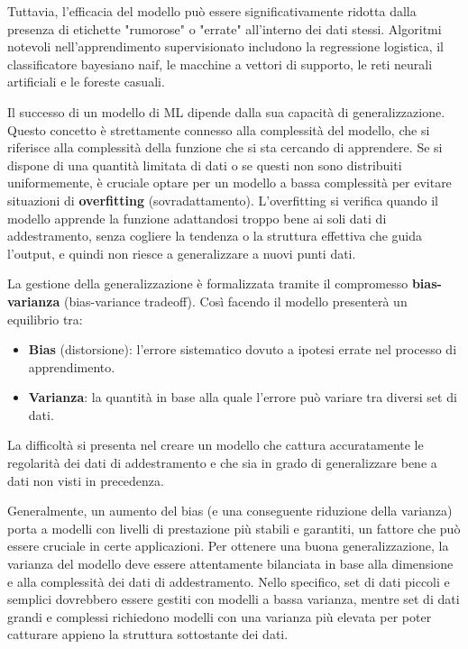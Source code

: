 Tuttavia, l'efficacia del modello può essere significativamente ridotta dalla
presenza di etichette "rumorose" o "errate" all'interno dei dati stessi.
Algoritmi notevoli nell'apprendimento supervisionato includono la regressione
logistica, il classificatore bayesiano naif, le macchine a vettori di supporto,
le reti neurali artificiali e le foreste casuali.

Il successo di un modello di ML dipende dalla sua capacità di
generalizzazione. Questo concetto è strettamente connesso alla complessità del
modello, che si riferisce alla complessità della funzione che si sta cercando
di apprendere.
Se si dispone di una quantità limitata di dati o se questi non sono distribuiti
uniformemente, è cruciale optare per un modello a bassa complessità per evitare
situazioni di \textbf{overfitting} (sovradattamento).
L'overfitting si verifica quando il modello apprende la funzione adattandosi
troppo bene ai soli dati di addestramento, senza cogliere la tendenza o la
struttura effettiva che guida l'output, e quindi non riesce a generalizzare
a nuovi punti dati.

La gestione della generalizzazione è formalizzata tramite il compromesso
\textbf{bias-varianza} (bias-variance tradeoff).
Così facendo il modello presenterà un equilibrio tra:
\begin{itemize}
    \item \textbf{Bias} (distorsione): l'errore sistematico dovuto a ipotesi errate nel
    processo di apprendimento.
    \item \textbf{Varianza}: la quantità in base alla quale l'errore può
    variare tra diversi set di dati.
\end{itemize}

La difficoltà si presenta nel creare un modello che cattura accuratamente le
regolarità dei dati di addestramento e che sia in grado di generalizzare bene
a dati non visti in precedenza.

Generalmente, un aumento del bias (e una conseguente riduzione della
varianza) porta a modelli con livelli di prestazione più stabili e
garantiti, un fattore che può essere cruciale in certe applicazioni.
Per ottenere una buona generalizzazione, la varianza del
modello deve essere attentamente bilanciata in base alla dimensione e
alla complessità dei dati di addestramento. Nello specifico,
set di dati piccoli e semplici dovrebbero essere gestiti con modelli a
bassa varianza, mentre set di dati grandi e complessi richiedono
modelli con una varianza più elevata per poter catturare appieno la
struttura sottostante dei dati.

